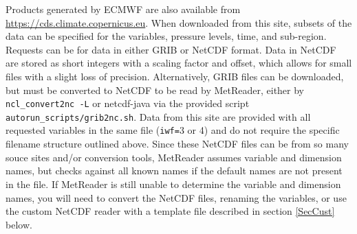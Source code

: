 \documentclass[11pt]{article}   %
\begin{document}
Products generated by ECMWF are also available from \url{https://cds.climate.copernicus.eu}.
When downloaded from this site, subsets of the data can be specified for the variables, 
pressure levels, time, and sub-region. Requests can be for data in either GRIB or NetCDF
format. Data in NetCDF are stored as short integers with a scaling factor and offset, which
allows for small files with a slight loss of precision.  Alternatively, GRIB files can
be downloaded, but must be converted to NetCDF to be read by MetReader, either by
\texttt{ncl\_convert2nc -L} or netcdf-java via the provided script \texttt{autorun\_scripts/grib2nc.sh}.
Data from this site are provided with all requested variables in the same file 
(\texttt{iwf=}3 or 4) and do not require the specific filename structure outlined above.
Since these NetCDF files can be from so many souce sites and/or conversion tools, MetReader
assumes variable and dimension names, but checks against all known names if the default
names are not present in the file.  If MetReader is still unable to determine the variable
and dimension names, you will need to convert the NetCDF files, renaming the variables, or
use the custom NetCDF reader with a template file described in section \ref{SecCust} below.
\end{document}
